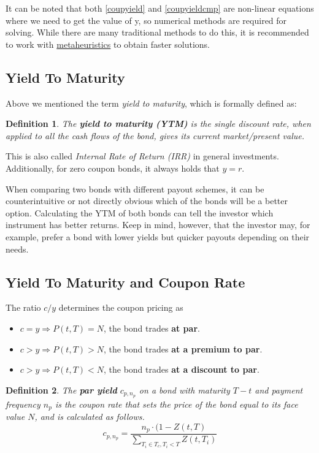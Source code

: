 \documentclass[10pt,letterpaper]{article}
\newtheorem{definition}{Definition}
\begin{document}
It can be noted that both \eqref{coupyield} and \eqref{coupyieldcmp} are non-linear equations where we need to get the value of y, so numerical methods are required for solving. While there are many traditional methods to do this, it is recommended to work with \href{https://en.wikipedia.org/wiki/Metaheuristic}{metaheuristics} to obtain faster solutions.

\subsection{Yield To Maturity}

Above we mentioned the term \emph{yield to maturity}, which is formally defined as:

\begin{definition}
The \emph{\textbf{yield to maturity (YTM)}} is the single discount rate, when applied to all the cash flows of the bond, gives its current market/present value.
\end{definition}

This is also called \emph{Internal Rate of Return (IRR)} in general investments. Additionally, for zero coupon bonds, it always holds that $y=r$.

When comparing two bonds with different payout schemes, it can be counterintuitive or not directly obvious which of the bonds will be a better option. Calculating the YTM of both bonds can tell the investor which instrument has better returns. Keep in mind, however, that the investor may, for example, prefer a bond with lower yields but quicker payouts depending on their needs.

\subsection{Yield To Maturity and Coupon Rate}
The ratio $c/y$ determines the coupon pricing as
\begin{itemize}
\item $c=y\Rightarrow P(t,T) = N$, the bond trades \textbf{at par}.
\item $c>y\Rightarrow P(t,T) > N$, the bond trades \textbf{at a premium to par}.
\item $c>y\Rightarrow P(t,T) < N$, the bond trades \textbf{at a discount to par}.
\end{itemize}

\begin{definition}
The \emph{\textbf{par yield}} $c_{p,n_p}$ on a bond with maturity $T-t$ and payment frequency $n_p$ is the coupon rate that sets the price of the bond equal to its face value $N$, and is calculated as follows.
\begin{equation}\label{paryield}
c_{p,n_p} = \frac{n_p\cdot(1-Z(t,T)}{\sum_{T_i \in T_c, T_i < T}Z(t, T_i)}
\end{equation}
\end{definition}
\end{document}

